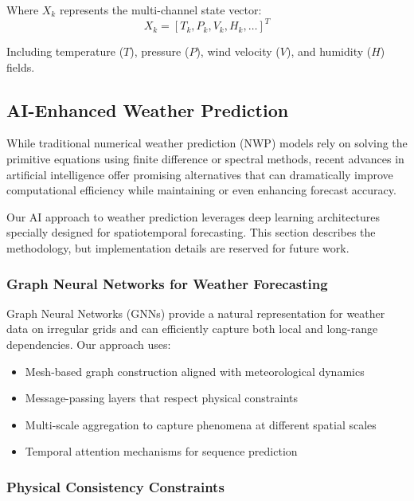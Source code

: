 \documentclass{article}
\begin{document}
Where $X_k$ represents the multi-channel state vector:
\begin{equation}
X_k = [T_k, P_k, V_k, H_k, \ldots]^T
\end{equation}

Including temperature ($T$), pressure ($P$), wind velocity ($V$), and humidity ($H$) fields.

\subsection{AI-Enhanced Weather Prediction}
\label{sec:ai_weather}

While traditional numerical weather prediction (NWP) models rely on solving the primitive equations using finite difference or spectral methods, recent advances in artificial intelligence offer promising alternatives that can dramatically improve computational efficiency while maintaining or even enhancing forecast accuracy.

Our AI approach to weather prediction leverages deep learning architectures specially designed for spatiotemporal forecasting. This section describes the methodology, but implementation details are reserved for future work.

\subsubsection{Graph Neural Networks for Weather Forecasting}

Graph Neural Networks (GNNs) provide a natural representation for weather data on irregular grids and can efficiently capture both local and long-range dependencies. Our approach uses:

\begin{itemize}
    \item Mesh-based graph construction aligned with meteorological dynamics
    \item Message-passing layers that respect physical constraints
    \item Multi-scale aggregation to capture phenomena at different spatial scales
    \item Temporal attention mechanisms for sequence prediction
\end{itemize}

\subsubsection{Physical Consistency Constraints}
\end{document}
